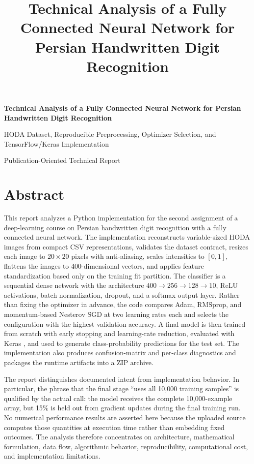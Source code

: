 \documentclass[11pt,a4paper]{article}
\title{Technical Analysis of a Fully Connected Neural Network for Persian Handwritten Digit Recognition}
\author{}
\date{}
\newcommand{\code}[1]{\texttt{\detokenize{#1}}}
\begin{document}
\begin{titlepage}
\centering
\vspace*{25mm}
{\LARGE\bfseries Technical Analysis of a Fully Connected Neural Network for Persian Handwritten Digit Recognition\par}
\vspace{7mm}
{\large HODA Dataset, Reproducible Preprocessing, Optimizer Selection, and TensorFlow/Keras Implementation\par}
\vfill
{\large Publication-Oriented Technical Report\par}
\vspace{10mm}
\end{titlepage}

\tableofcontents
\newpage

\section*{Abstract}
This report analyzes a Python implementation for the second assignment of a deep-learning course on Persian handwritten digit recognition with a fully connected neural network. The implementation reconstructs variable-sized HODA images from compact CSV representations, validates the dataset contract, resizes each image to $20\times20$ pixels with anti-aliasing, scales intensities to $[0,1]$, flattens the images to 400-dimensional vectors, and applies feature standardization based only on the training fit partition. The classifier is a sequential dense network with the architecture $400\rightarrow256\rightarrow128\rightarrow10$, ReLU activations, batch normalization, dropout, and a softmax output layer. Rather than fixing the optimizer in advance, the code compares Adam, RMSprop, and momentum-based Nesterov SGD at two learning rates each and selects the configuration with the highest validation accuracy. A final model is then trained from scratch with early stopping and learning-rate reduction, evaluated with Keras \code{evaluate}, and used to generate class-probability predictions for the test set. The implementation also produces confusion-matrix and per-class diagnostics and packages the runtime artifacts into a ZIP archive.

The report distinguishes documented intent from implementation behavior. In particular, the phrase that the final stage ``uses all 10,000 training samples'' is qualified by the actual \code{validation_split=0.15} call: the model receives the complete 10,000-example array, but 15\% is held out from gradient updates during the final training run. No numerical performance results are asserted here because the uploaded source computes those quantities at execution time rather than embedding fixed outcomes. The analysis therefore concentrates on architecture, mathematical formulation, data flow, algorithmic behavior, reproducibility, computational cost, and implementation limitations.
\end{document}
